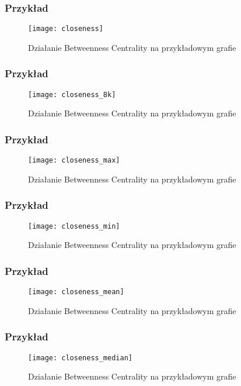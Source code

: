 \FloatBarrier
\subsubsection{Przykład}
\begin{figure}[h]
	\centering
	\texttt{[image: closeness]}
	\caption{Działanie Betweenness Centrality  na przykładowym grafie}
\end{figure}
\FloatBarrier\FloatBarrier
\subsubsection{Przykład}
\begin{figure}[h]
	\centering
	\texttt{[image: closeness\_8k]}
	\caption{Działanie Betweenness Centrality  na przykładowym grafie}
\end{figure}
\FloatBarrier\FloatBarrier
\subsubsection{Przykład}
\begin{figure}[h]
	\centering
	\texttt{[image: closeness\_max]}
	\caption{Działanie Betweenness Centrality  na przykładowym grafie}
\end{figure}
\FloatBarrier\FloatBarrier
\subsubsection{Przykład}
\begin{figure}[h]
	\centering
	\texttt{[image: closeness\_min]}
	\caption{Działanie Betweenness Centrality  na przykładowym grafie}
\end{figure}
\FloatBarrier\FloatBarrier
\subsubsection{Przykład}
\begin{figure}[h]
	\centering
	\texttt{[image: closeness\_mean]}
	\caption{Działanie Betweenness Centrality  na przykładowym grafie}
\end{figure}
\FloatBarrier\FloatBarrier
\subsubsection{Przykład}
\begin{figure}[h]
	\centering
	\texttt{[image: closeness\_median]}
	\caption{Działanie Betweenness Centrality  na przykładowym grafie}
\end{figure}
\FloatBarrier